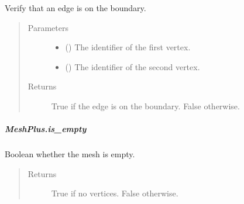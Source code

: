 \documentclass[letterpaper,10pt,english]{sphinxmanual}
\begin{document}
\begin{fulllineitems}
\begin{fulllineitems}
\label{\detokenize{api/generated/directional_clustering.mesh.MeshPlus.is_edge_on_boundary:directional_clustering.mesh.MeshPlus.is_edge_on_boundary}}
Verify that an edge is on the boundary.
\begin{quote}\begin{description}
\item[{Parameters}] \leavevmode\begin{itemize}
\item {} 
 () \textendash{} The identifier of the first vertex.

\item {} 
 () \textendash{} The identifier of the second vertex.

\end{itemize}

\item[{Returns}] \leavevmode
{} \textendash{} True if the edge is on the boundary.
False otherwise.

\end{description}\end{quote}

\end{fulllineitems}



\subparagraph{MeshPlus.is\_empty}
\label{\detokenize{api/generated/directional_clustering.mesh.MeshPlus.is_empty:meshplus-is-empty}}\label{\detokenize{api/generated/directional_clustering.mesh.MeshPlus.is_empty::doc}}

\begin{fulllineitems}
\label{\detokenize{api/generated/directional_clustering.mesh.MeshPlus.is_empty:directional_clustering.mesh.MeshPlus.is_empty}}
Boolean whether the mesh is empty.
\begin{quote}\begin{description}
\item[{Returns}] \leavevmode
{} \textendash{} True if no vertices. False otherwise.


\end{description}
\end{quote}
\end{fulllineitems}
\end{fulllineitems}
\end{document}
